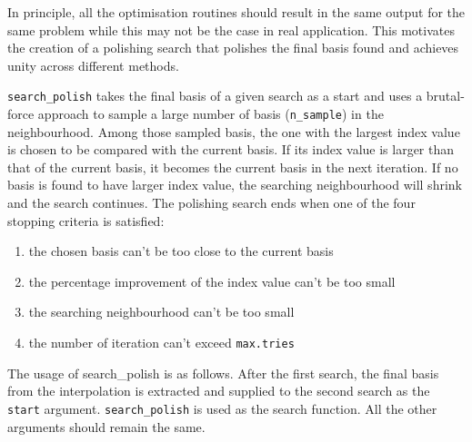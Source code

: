 \documentclass[12pt]{article}
\providecommand{\tightlist}{%
  \setlength{\itemsep}{0pt}\setlength{\parskip}{0pt}}
\begin{document}
In principle, all the optimisation routines should result in the same
output for the same problem while this may not be the case in real
application. This motivates the creation of a polishing search that
polishes the final basis found and achieves unity across different
methods.

\texttt{search\_polish} takes the final basis of a given search as a
start and uses a brutal-force approach to sample a large number of basis
(\texttt{n\_sample}) in the neighbourhood. Among those sampled basis,
the one with the largest index value is chosen to be compared with the
current basis. If its index value is larger than that of the current
basis, it becomes the current basis in the next iteration. If no basis
is found to have larger index value, the searching neighbourhood will
shrink and the search continues. The polishing search ends when one of
the four stopping criteria is satisfied:

\begin{enumerate}
\def\labelenumi{\arabic{enumi})}
\tightlist
\item
  the chosen basis can't be too close to the current basis
\item
  the percentage improvement of the index value can't be too small
\item
  the searching neighbourhood can't be too small
\item
  the number of iteration can't exceed \texttt{max.tries}
\end{enumerate}

The usage of search\_polish is as follows. After the first search, the
final basis from the interpolation is extracted and supplied to the
second search as the \texttt{start} argument. \texttt{search\_polish} is
used as the search function. All the other arguments should remain the
same.
\end{document}
